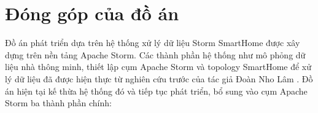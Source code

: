 



\section{Đóng góp của đồ án}

Đồ án phát triển dựa trên hệ thống xử lý dữ liệu Storm SmartHome được xây dựng trên nền tảng Apache Storm. Các thành phần hệ thống như mô phỏng dữ liệu nhà thông minh, thiết lập cụm Apache Storm và topology SmartHome để xử lý dữ liệu đã được hiện thực từ nghiên cứu trước của tác giả Đoàn Nho Lâm \autocite{fimocodestormsmarthome}. Đồ án hiện tại kế thừa hệ thống đó và tiếp tục phát triển, bổ sung vào cụm Apache Storm ba thành phần chính:

